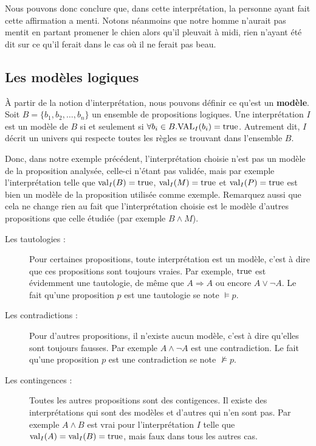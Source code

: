 Nous pouvons donc conclure que, dans cette interprétation, la personne ayant
fait cette affirmation a menti. Notons néanmoins que notre homme n'aurait pas
mentit en partant promener le chien alors qu'il pleuvait à midi, rien n'ayant
été dit sur ce qu'il ferait dans le cas où il ne ferait pas beau.


\subsection{Les modèles logiques}

À partir de la notion d’interprétation, nous pouvons définir ce qu’est
un \textbf{modèle}. Soit $B = \{b_1, b_2, \dots, b_n \}$ un ensemble de
propositions logiques. Une interprétation $I$ est un modèle de $B$ si et
seulement si $\forall b_i \in B. \mathrm{VAL}_I(b_i) = \mathrm{true}$. Autrement dit, $I$
décrit un univers qui respecte toutes les règles se trouvant dans l’ensemble
$B$.

Donc, dans notre exemple précédent, l’interprétation choisie n’est pas un modèle
de la proposition analysée, celle-ci n’étant pas validée, mais par exemple
l’interprétation telle que $\mathrm{val}_I(B) = \mathrm{true}$, $\mathrm{val}_I(M) = \mathrm{true}$ et
$\mathrm{val}_I(P) = \mathrm{true}$ est bien un modèle de la proposition utilisée comme
exemple. Remarquez aussi que cela ne change rien au fait que l’interprétation
choisie est le modèle d’autres propositions que celle étudiée (par exemple $B
\land M$).

\begin{description}\item[Les tautologies :] Pour certaines propositions, toute interprétation est un modèle, c’est à dire que ces propositions sont toujours
  vraies. Par exemple, $\mathrm{true}$ est évidemment une tautologie, de même que $A
  \Rightarrow A$ ou encore $A \lor \lnot A$. Le fait qu’une proposition $p$ est
  une tautologie se note $\vDash p$.
\item[Les contradictions :] Pour d’autres propositions, il n’existe aucun
  modèle, c’est à dire qu’elles sont toujours fausses. Par exemple $A \land
  \lnot A$ est une contradiction. Le fait qu’une proposition $p$ est une
  contradiction se note $\nvDash p$.
\item[Les contingences :] Toutes les autres propositions sont des contigences. Il
  existe des interprétations qui sont des modèles et d’autres qui n’en sont
  pas. Par exemple $A \land B$ est vrai pour l’interprétation $I$ telle que
  $\mathrm{val}_I(A) = \mathrm{val}_I(B) = \mathrm{true}$, mais faux dans tous les autres cas.
\end{description}

